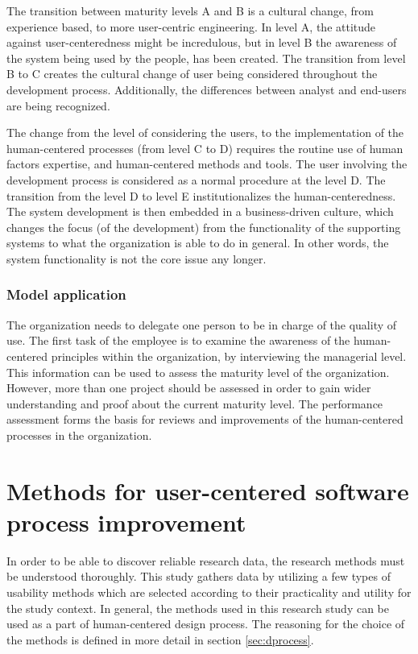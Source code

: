 \documentclass[12pt,a4paper,oneside,pdftex]{report}
\begin{document}
The transition between maturity levels A and B is a cultural change, from experience based, to more user-centric engineering. In level A, the attitude against user-centeredness might be incredulous, but in level B the awareness of the system being used by the people, has been created. The transition from level B to C creates the cultural change of user being considered throughout the development process. Additionally, the differences between analyst and end-users are being recognized. \citep{RefWorks:30}

The change from the level of considering the users, to the implementation of the human-centered processes (from level C to D) requires the routine use of human factors expertise, and human-centered methods and tools. The user involving the development process is considered as a normal procedure at the level D. The transition from the level D to level E institutionalizes the human-centeredness. The system development is then embedded in a business-driven culture, which changes the focus (of the development) from the functionality of the supporting systems to what the organization is able to do in general. In other words, the system functionality is not the core issue any longer.  \citep{RefWorks:30}

\subsection{Model application}

The organization needs to delegate one person to be in charge of the quality of use. The first task of the employee is to examine the awareness of the human-centered principles within the organization, by interviewing the managerial level. This information can be used to assess the maturity level of the organization. However, more than one project should be assessed in order to gain wider understanding and proof about the current maturity level. The performance assessment forms the basis for reviews and improvements of the human-centered processes in the organization. \citep{RefWorks:30}

\chapter{Methods for user-centered software process improvement}
\label{chapter:methods}


In order to be able to discover reliable research data, the research methods must be understood thoroughly. This study gathers data by utilizing a few types of usability methods which are selected according to their practicality and utility for the study context. In general, the methods used in this research study can be used as a part of human-centered design process. The reasoning for the choice of the methods is defined in more detail in section \ref{sec:dprocess}. 
\end{document}
